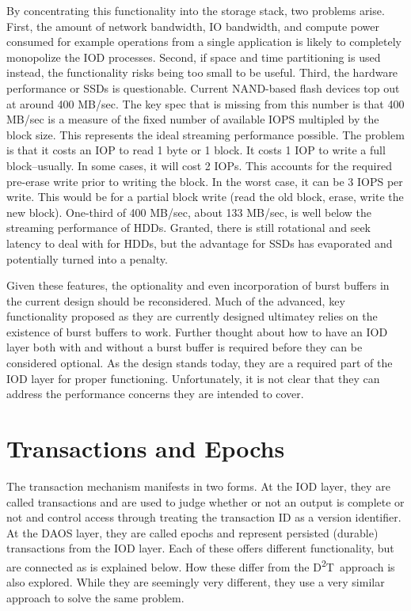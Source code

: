 \documentclass[conference]{sig-alt-gov2}
\newcommand{\DDT}{D\textsuperscript{2}T~}
\begin{document}
By concentrating this functionality into the storage stack, two problems arise.
First, the amount of network bandwidth, IO bandwidth, and compute power
consumed for example operations from a single application is likely to
completely monopolize the IOD processes. Second, if space and time partitioning
is used instead, the functionality risks being too small to be useful. Third,
the hardware performance or SSDs is questionable. Current NAND-based flash
devices top out at around 400 MB/sec. The key spec that is missing from this
number is that 400 MB/sec is a measure of the fixed number of available IOPS
multipled by the block size. This represents the ideal streaming performance
possible. The problem is that it costs an IOP to read 1 byte or 1 block. It
costs 1 IOP to write a full block--usually. In some cases, it will cost 2 IOPs.
This accounts for the required pre-erase write prior to writing the block. In
the worst case, it can be 3 IOPS per write. This would be for a partial block
write (read the old block, erase, write the new block). One-third of 400
MB/sec, about 133 MB/sec, is well below the streaming performance of HDDs.
Granted, there is still rotational and seek latency to deal with for HDDs, but
the advantage for SSDs has evaporated and potentially turned into a penalty.

Given these features, the optionality and even incorporation of burst buffers
in the current design should be reconsidered. Much of the advanced, key
functionality proposed as they are currently designed ultimatey relies on the
existence of burst buffers to work. Further thought about how to have an IOD
layer both with and without a burst buffer is required before they can be
considered optional. As the design stands today, they are a required part of
the IOD layer for proper functioning. Unfortunately, it is not clear that they
can address the performance concerns they are intended to cover.

\section{Transactions and Epochs}
\label{sec:transactions}

The transaction mechanism manifests in two forms. At the IOD layer, they are
called transactions and are used to judge whether or not an output is complete
or not and control access through treating the transaction ID as a version
identifier. At the DAOS layer, they are called epochs and represent persisted
(durable) transactions from the IOD layer. Each of these offers different
functionality, but are connected as is explained below. How these differ from
the \DDT approach is also explored. While they are seemingly very different,
they use a very similar approach to solve the same problem.
\end{document}
